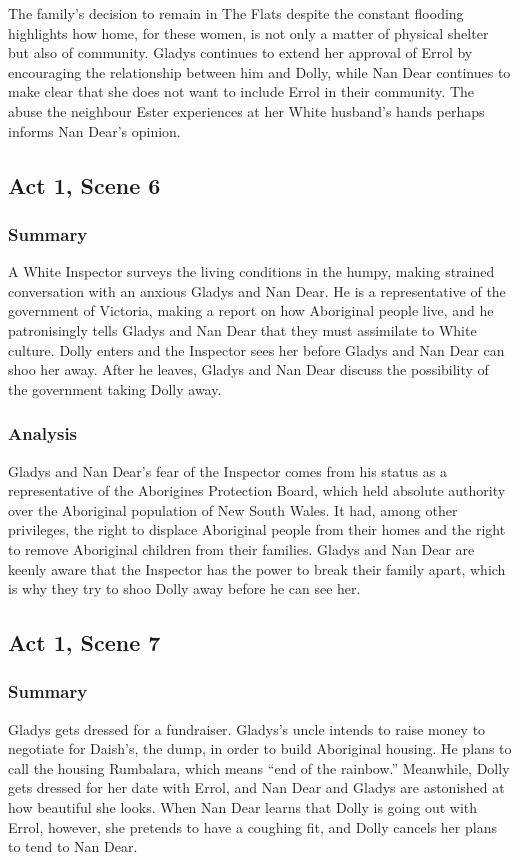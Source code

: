 \documentclass[a4paper]{article}
\begin{document}
The family’s decision to remain in The Flats despite the constant
flooding highlights how home, for these women, is not only a matter
of physical shelter but also of community. Gladys continues to
extend her approval of Errol by encouraging the relationship
between him and Dolly, while Nan Dear continues to make clear
that she does not want to include Errol in their community. The
abuse the neighbour Ester experiences at her White husband’s hands
perhaps informs Nan Dear’s opinion.\\

\subsection{Act 1, Scene 6}
\subsubsection{Summary}
A White Inspector surveys the living conditions in the humpy,
making strained conversation with an anxious Gladys and Nan
Dear. He is a representative of the government of Victoria,
making a report on how Aboriginal people live, and he
patronisingly tells Gladys and Nan Dear that they must
assimilate to White culture. Dolly enters and the Inspector
sees her before Gladys and Nan Dear can shoo her away. After
he leaves, Gladys and Nan Dear discuss the possibility of the
government taking Dolly away.\\

\subsubsection{Analysis}
Gladys and Nan Dear’s fear of the Inspector comes from his status
as a representative of the Aborigines Protection Board, which held
absolute authority over the Aboriginal population of New South
Wales. It had, among other privileges, the right to displace
Aboriginal people from their homes and the right to remove
Aboriginal children from their families. Gladys and Nan Dear are
keenly aware that the Inspector has the power to break their family
apart, which is why they try to shoo Dolly away before he can see
her.\\


\subsection{Act 1, Scene 7}
\subsubsection{Summary}
Gladys gets dressed for a fundraiser. Gladys’s uncle intends to
raise money to negotiate for Daish’s, the dump, in order to
build Aboriginal housing. He plans to call the housing
Rumbalara, which means “end of the rainbow.” Meanwhile,
Dolly gets dressed for her date with Errol, and Nan Dear and
Gladys are astonished at how beautiful she looks. When Nan
Dear learns that Dolly is going out with Errol, however, she
pretends to have a coughing fit, and Dolly cancels her plans to
tend to Nan Dear.\\
\end{document}
